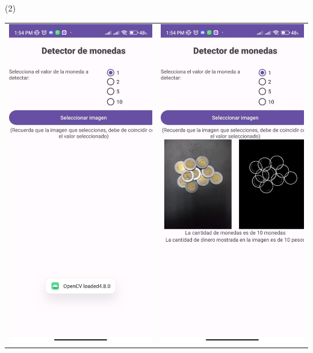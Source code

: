\begin{frame}{\citetitle{\EntradaBibtex} (2)}

\begin{center}
	\begin{tabular}{cc}
		\includegraphics[width=0.28\linewidth]{2024_ConteoMonedasEscritorio/figs/1.jpeg} &
		\includegraphics[width=0.28\linewidth]{2024_ConteoMonedasEscritorio/figs/4.jpeg} \\

	\end{tabular}
\end{center}
\end{frame}



\renewcommand{\EntradaBibtex}{ConteoMonedasEscritorio_SistemasInteligentes_UPV_2024}

